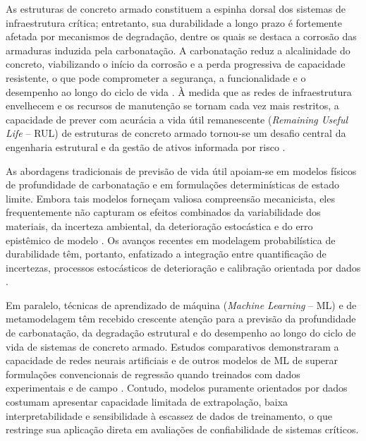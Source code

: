 
As estruturas de concreto armado constituem a espinha dorsal dos sistemas de infraestrutura crítica; entretanto, sua durabilidade a longo prazo é fortemente afetada por mecanismos de degradação, dentre os quais se destaca a corrosão das armaduras induzida pela carbonatação. A carbonatação reduz a alcalinidade do concreto, viabilizando o início da corrosão e a perda progressiva de capacidade resistente, o que pode comprometer a segurança, a funcionalidade e o desempenho ao longo do ciclo de vida \citep{tuutti1982, possan2010}. À medida que as redes de infraestrutura envelhecem e os recursos de manutenção se tornam cada vez mais restritos, a capacidade de prever com acurácia a vida útil remanescente (\textit{Remaining Useful Life} -- RUL) de estruturas de concreto armado tornou-se um desafio central da engenharia estrutural e da gestão de ativos informada por risco \citep{ellingwood2005, frangopol2011, si2011}.

As abordagens tradicionais de previsão de vida útil apoiam-se em modelos físicos de profundidade de carbonatação e em formulações determinísticas de estado limite. Embora tais modelos forneçam valiosa compreensão mecanicista, eles frequentemente não capturam os efeitos combinados da variabilidade dos materiais, da incerteza ambiental, da deterioração estocástica e do erro epistêmico de modelo \citep{possan2010, melchers2018}. Os avanços recentes em modelagem probabilística de durabilidade têm, portanto, enfatizado a integração entre quantificação de incertezas, processos estocásticos de deterioração e calibração orientada por dados \citep{jcss2001, fib2006}.

Em paralelo, técnicas de aprendizado de máquina (\textit{Machine Learning} -- ML) e de metamodelagem têm recebido crescente atenção para a previsão da profundidade de carbonatação, da degradação estrutural e do desempenho ao longo do ciclo de vida de sistemas de concreto armado. Estudos comparativos demonstraram a capacidade de redes neurais artificiais e de outros modelos de ML de superar formulações convencionais de regressão quando treinados com dados experimentais e de campo \citep{couto2025}. Contudo, modelos puramente orientados por dados costumam apresentar capacidade limitada de extrapolação, baixa interpretabilidade e sensibilidade à escassez de dados de treinamento, o que restringe sua aplicação direta em avaliações de confiabilidade de sistemas críticos.

